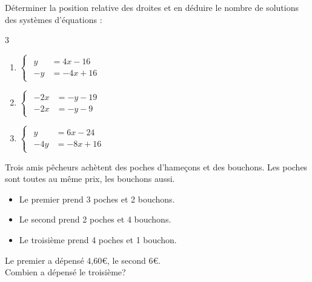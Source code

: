 {\newpage
\begin{Exercice}
Déterminer la position relative des droites et en déduire le nombre de solutions des systèmes d'équations :
\vspace{-0.5cm}
\begin{multicols}{3}
\begin{enumerate}[itemsep=1em]
	\item \begin{minipage}[t]{\linewidth}$\begin{cases}\begin{aligned}y &=4x-16\\-y &=-4x+16\end{aligned}\end{cases}$\end{minipage}
	\item \begin{minipage}[t]{\linewidth}$\begin{cases}\begin{aligned}-2x &=-y-19\\-2x &=-y-9\end{aligned}\end{cases}$\end{minipage}
	\item \begin{minipage}[t]{\linewidth}$\begin{cases}\begin{aligned}y &=6x-24\\-4y &=-8x+16\end{aligned}\end{cases}$\end{minipage}
\end{enumerate}
\end{multicols}
\end{Exercice}

\begin{Exercice}
Trois amis pêcheurs achètent des poches d'hameçons et des bouchons. Les poches sont toutes au même prix, les bouchons aussi.
\begin{itemize}[label=\textcolor{Couleur6}{$\bullet$}]
\item Le premier prend 3 poches et 2 bouchons.
\item Le second prend 2 poches et 4 bouchons.
\item Le troisième prend 4 poches et 1 bouchon.
\end{itemize} 
Le premier a dépensé 4,60€, le second 6€. \\
Combien a dépensé le troisième?


\end{Exercice}}
